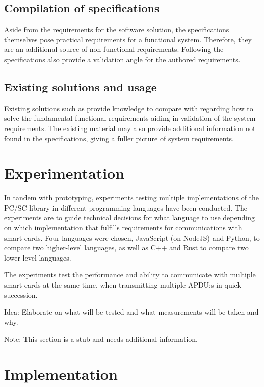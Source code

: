 \subsection{Compilation of specifications}

Aside from the requirements for the software solution, the
specifications \cite{etsi-ts-102-221, etsi-ts-131-102} 
themselves pose practical requirements for a functional system.
Therefore, they are an additional source of non-functional
requirements. Following the specifications also provide a
validation angle for the authored requirements.

\subsection{Existing solutions and usage}

Existing solutions such as \cite{osmocom-remsim} provide knowledge
to compare with regarding how to solve the fundamental functional
requirements aiding in validation of the system requirements. The
existing material may also provide additional information not found
in the specifications, giving a fuller picture of system
requirements.

\section{Experimentation}
\label{sec:experimentation}

In tandem with prototyping, experiments testing multiple
implementations of the PC/SC \cite{pcsc} library in different
programming languages have been conducted. The experiments are
to guide technical decisions for what language to use depending on
which implementation that fulfills requirements for communications
with smart cards. Four languages were chosen, JavaScript (on
NodeJS) and Python, to compare two higher-level languages, as well
as C++ and Rust to compare two lower-level languages.

The experiments test the performance and ability to communicate with
multiple smart cards at the same time, when transmitting multiple
APDU:s in quick succession.

Idea: Elaborate on what will be tested and what measurements will
be taken and why.

Note: This section is a stub and needs additional information.

\section{Implementation}
\label{sec:implementation}

